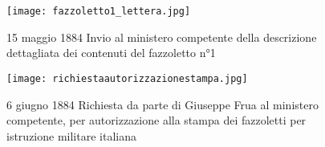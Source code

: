 \begin{figure}[h]
	\centering
		\texttt{[image: fazzoletto1\_lettera.jpg]}
	\caption{15 maggio 1884 Invio al ministero competente della descrizione dettagliata dei contenuti  del fazzoletto n°1}
	\label{fig:fazzoletto1_lettera}
\end{figure}

\newpage

\begin{figure}[h]
	\centering
		\texttt{[image: richiestaautorizzazionestampa.jpg]}
	\caption{6 giugno 1884 Richiesta da parte di Giuseppe Frua al ministero competente, per autorizzazione alla stampa dei fazzoletti per istruzione militare italiana}
	\label{fig:richiestaautorizzazionestampa}
\end{figure}

\clearpage







   
   
